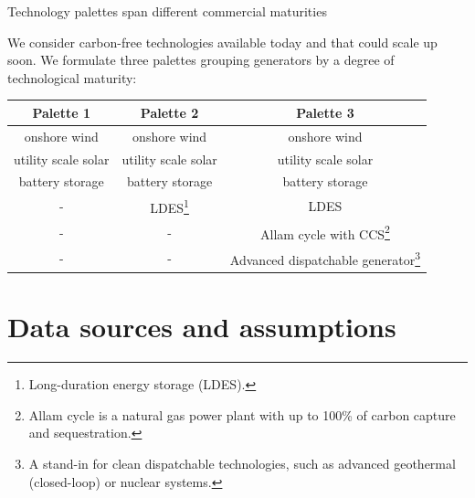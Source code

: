 \begin{frame}{Technology palettes span different commercial maturities}

  {\small

  We consider carbon-free technologies available today and that could scale up soon.
  We formulate \alert{three palettes} grouping generators by a degree of technological
  maturity:

  \centering
  \begin{table}[h]
  \begin{tabular}{ccc}
    \hline
    \alert{Palette 1} & \alert{Palette 2} &  \alert{Palette 3} \\
    \hline
      onshore wind & onshore wind  & onshore wind \\
    \hline
      utility scale solar & utility scale solar  & utility scale solar \\
    \hline
      battery storage & battery storage  & battery storage \\
    \hline
      - & LDES\footnote{{\scriptsize Long-duration energy storage (LDES).}} & LDES \\
    \hline
      - & - & Allam cycle with CCS\footnote{{\scriptsize Allam cycle is a natural gas power plant
      with up to 100\% of carbon capture and sequestration.}}  \\
    \hline
      - & - & Advanced dispatchable generator\footnote{{\scriptsize A stand-in for clean dispatchable technologies,
      such as advanced geothermal (closed-loop) or nuclear systems.}} \\
  \end{tabular}
  \end{table}
  }
  \vspace{0.5cm}

\end{frame}


\section{Data sources and assumptions}


